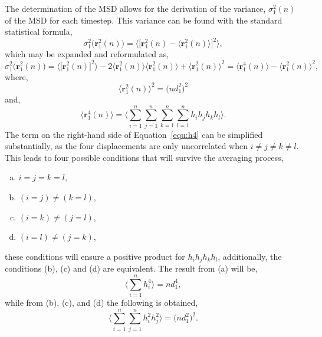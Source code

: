 \documentclass[reprint,superscriptaddress,nobibnotes,amsmath,amssymb,aps,onecolumn]{revtex4-2}
\begin{document}
The determination of the MSD allows for the derivation of the variance, $\sigma_1^2(n)$ of the MSD for each timestep.
This variance can be found with the standard statistical formula,
%
\begin{equation}
    \sigma_1^2\big(\mathbf{r}_1^2(n)\big) = \bigg\langle \Big[ \mathbf{r}_1^2(n) - \big\langle \mathbf{r}_1^2(n) \big\rangle \Big] ^ 2 \bigg\rangle,
\end{equation}
%
which may be expanded and reformulated as,
%
\begin{equation}
    \sigma_1^2\big(\mathbf{r}_1^2(n)\big) = \Big\langle \big[ \mathbf{r}_1^2(n) \big] ^ 2 \Big\rangle - 2 \Big\langle \mathbf{r}_1^2(n) \Big\rangle \Big\langle \mathbf{r}_1^2(n) \Big\rangle + \Big\langle \mathbf{r}_1^2(n) \Big\rangle ^2 = \Big\langle \mathbf{r}_1^4(n) \Big\rangle - \Big\langle \mathbf{r}_1^2(n) \Big\rangle ^2,
    \label{equ:exp}
\end{equation}
%
where,
%
\begin{equation}
    \Big\langle \mathbf{r}_1^2(n) \Big\rangle ^2 = \big(n d_1^2\big) ^2
    \label{equ:smsd}
\end{equation}
%
and,
%
\begin{equation}
    \Big\langle \mathbf{r}_1^4(n) \Big\rangle = \Bigg\langle \sum_{i=1}^{n} \sum_{j=1}^{n} \sum_{k=1}^{n} \sum_{l=1}^{n} h_ih_jh_kh_l \Bigg\rangle.
    \label{equ:h4}
\end{equation}
%
The term on the right-hand side of Equation~\ref{equ:h4} can be simplified substantially, as the four displacements are only uncorrelated when $i \neq j \neq k \neq l$.
This leads to four possible conditions that will survive the averaging process,
%
\begin{enumerate}[(a)]
    \item $i = j = k = l$,
    \item $(i = j) \neq (k = l)$,
    \item $(i = k) \neq (j = l)$,
    \item $(i = l) \neq (j = k)$,
\end{enumerate}
%
these conditions will ensure a positive product for $h_ih_jh_kh_l$, additionally, the conditions (b), (c) and (d) are equivalent.
The result from (a) will be,
%
\begin{equation}
    \Bigg\langle \sum_{i=1}^{n} h_i^4 \Bigg\rangle = n d_1^4,
\end{equation}
%
while from (b), (c), and (d) the following is obtained,
%
\begin{equation}
    \Bigg\langle \sum_{i=1}^{n} \sum_{j=1}^{n} h_i^2 h_j^2 \Bigg\rangle = \big(n d_1^2\big)^2.
\end{equation}
\end{document}
